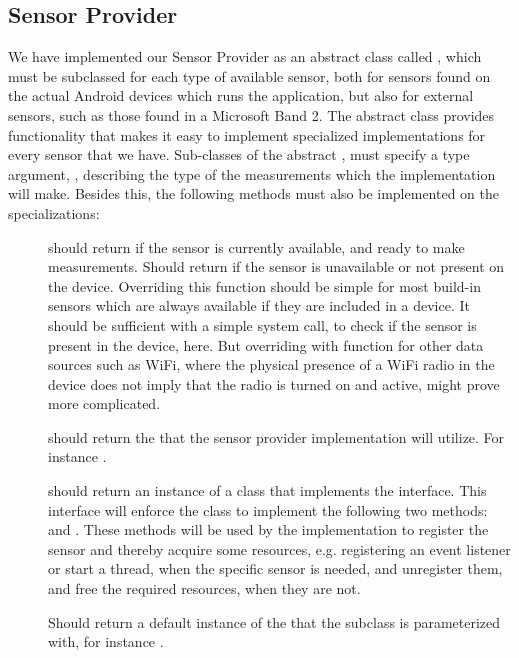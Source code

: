 \subsection{Sensor Provider}
\label{sub:providing_sensor_data_implementation}
We have implemented our Sensor Provider as an abstract class called , which must be subclassed for each type of available sensor, both for sensors found on the actual Android devices which runs the application, but also for external sensors, such as those found in a Microsoft Band 2. The abstract class provides functionality that makes it easy to implement specialized implementations for every sensor that we have. Sub-classes of the abstract , must specify a type argument, , describing the type of the measurements which the implementation will make. Besides this, the following methods must also be implemented on the specializations:


\begin{description}
	\item[] should return  if the sensor is currently available, and ready to make measurements. Should return  if the sensor is unavailable or not present on the device. Overriding this function should be simple for most build-in sensors which are always available if they are included in a device. It should be sufficient with a simple system call, to check if the sensor is present in the device, here. But overriding with function for other data sources such as WiFi, where the physical presence of a WiFi radio in the device does not imply that the radio is turned on and active, might prove more complicated.   

	\item[] should return the  that the sensor provider implementation will utilize. For instance .

	\item[] should return an instance of a class that implements the  interface. This interface will enforce the class to implement the following two methods:  and . These methods will be used by the  implementation to register the sensor and thereby acquire some resources, e.g. registering an event listener or start a thread, when the specific sensor is needed, and unregister them, and free the required resources, when they are not.

  \item[] Should return a default instance of the  that the subclass is parameterized with, for instance .
\end{description}

